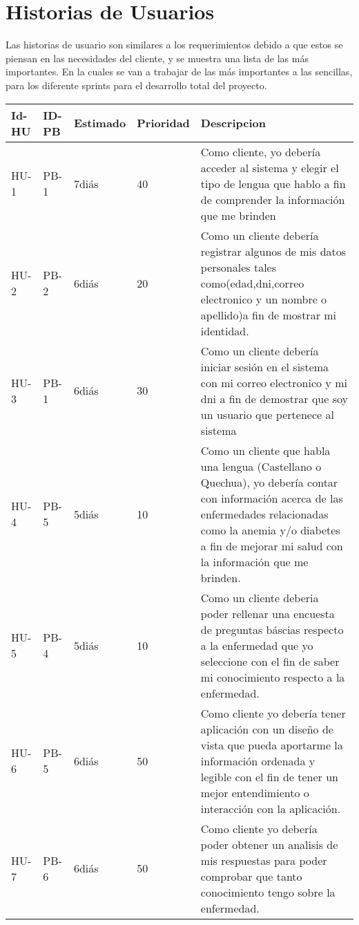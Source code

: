 \chapter{Historias de Usuarios}
Las historias de usuario son similares a los requerimientos debido a que estos se piensan en las necesidades del cliente, y se muestra una lista de las más importantes. En la cuales se van a trabajar de las más importantes a las sencillas, para los diferente sprints para el desarrollo total del proyecto. 
\begin{table}[htbp]
	\begin{center}
		\begin{tabular}{| p{1.6cm}| p{1.8cm}| p{1.8cm}|p{1.8cm} |p{7.8cm} |}
			\hline
			\textbf{Id-HU} & \textbf{ID-PB} & \textbf {Estimado}& \textbf{Prioridad} & \textbf{Descripcion}
			\\\hline  
			HU-1&PB-1& 7diás& 40&Como cliente, yo debería acceder al sistema y elegir el tipo de lengua que hablo a fin de comprender la información que me brinden
			\\ \hline
			HU-2&PB-2& 6diás& 20&Como un cliente debería registrar algunos de mis datos personales tales como(edad,dni,correo electronico y un nombre o apellido)a fin de mostrar mi identidad.
			\\ \hline
			HU-3&PB-1& 6diás& 30&Como un cliente debería iniciar sesión en el sistema con mi correo electronico y mi dni a fin de demostrar que soy un usuario que pertenece al sistema 
			\\ \hline
			HU-4&PB-5& 5diás& 10&Como un cliente que habla una lengua (Castellano o Quechua), yo debería contar con información acerca de las enfermedades relacionadas como la anemia y/o diabetes a fin de mejorar mi salud con la información que me brinden. 
			\\ \hline
			HU-5&PB-4& 5diás& 10&Como un cliente deberia poder rellenar una encuesta de preguntas báscias respecto a la enfermedad que yo seleccione con el fin de saber mi conocimiento respecto a la enfermedad. 
			\\ \hline
			HU-6&PB-5& 6diás&50&Como cliente yo debería tener aplicación con un diseño de vista que pueda aportarme la información ordenada y legible con el fin de tener un mejor entendimiento o interacción con la aplicación.
			\\ \hline
			HU-7&PB-6& 6diás&50&Como cliente yo debería poder obtener un analisis de mis respuestas para poder comprobar que tanto conocimiento tengo sobre la enfermedad.
			\\ \hline
		\end{tabular}
	\end{center}
\end{table}